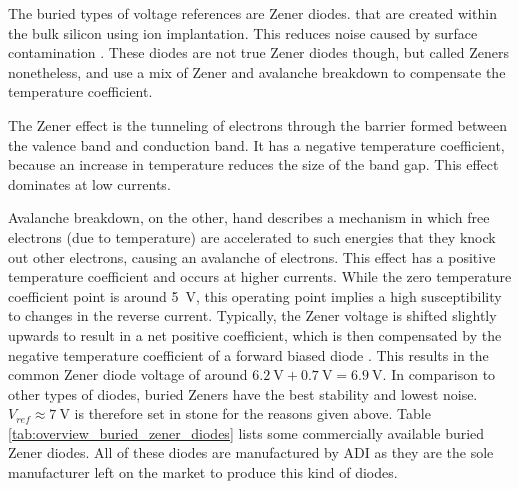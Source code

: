 The buried types of voltage references are Zener diodes. that are created within the bulk silicon using ion implantation. This reduces noise caused by surface contamination \cite{zener_diode_stability}. These diodes are not true Zener diodes though, but called Zeners nonetheless, and use a mix of Zener and avalanche breakdown to compensate the temperature coefficient.

The Zener effect is the tunneling of electrons through the barrier formed between the valence band and conduction band. It has a negative temperature coefficient, because an increase in temperature reduces the size of the band gap. This effect dominates at low currents.

Avalanche breakdown, on the other, hand describes a mechanism in which free electrons (due to temperature) are accelerated to such energies that they knock out other electrons, causing an avalanche of electrons. This effect has a positive temperature coefficient \cite{tempco_avalanche_breackdown} and occurs at higher currents. While the zero temperature coefficient point is around \qty{5}{\V}, this operating point implies a high susceptibility to changes in the reverse current. Typically, the Zener voltage is shifted slightly upwards to result in a net positive coefficient, which is then compensated by the negative temperature coefficient of a forward biased diode \cite{zener_diode_stability}. This results in the common Zener diode voltage of around $\qty{6.2}{\V} + \qty{0.7}{\V} = \qty{6.9}{\V}$. In comparison to other types of diodes, buried Zeners have the best stability and lowest noise. $V_{ref} \approx \qty{7}{\V}$ is therefore set in stone for the reasons given above. Table \ref{tab:overview_buried_zener_diodes} lists some commercially available buried Zener diodes. All of these diodes are manufactured by ADI as they are the sole manufacturer left on the market to produce this kind of diodes.
